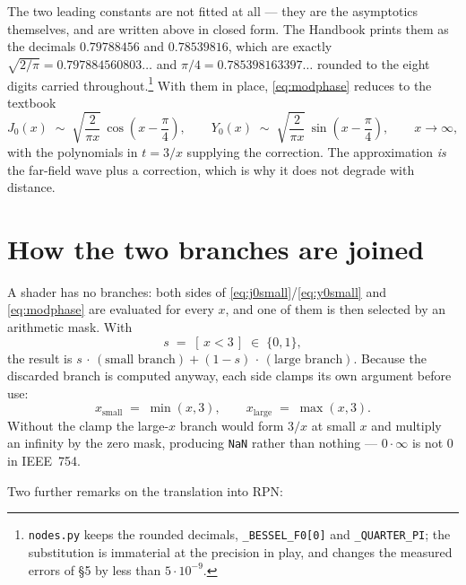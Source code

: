 \documentclass[11pt,a4paper]{article}
\newcommand{\node}[1]{\texttt{#1}}
\begin{document}
The two leading constants are not fitted at all --- they are the asymptotics
themselves, and are written above in closed form. The Handbook prints them as
the decimals $0.79788456$ and $0.78539816$, which are exactly
$\sqrt{2/\pi} = 0.797884560803\ldots$ and $\pi/4 = 0.785398163397\ldots$
rounded to the eight digits carried throughout.\footnote{\node{nodes.py} keeps
the rounded decimals, \node{\_BESSEL\_F0[0]} and \node{\_QUARTER\_PI}; the
substitution is immaterial at the precision in play, and changes the measured
errors of \S5 by less than $5\cdot10^{-9}$.} With them in place,
\eqref{eq:modphase} reduces to the textbook
%
\begin{equation}
  J_0(x) \;\sim\; \sqrt{\frac{2}{\pi x}}\,\cos\!\left(x-\frac{\pi}{4}\right),
  \qquad
  Y_0(x) \;\sim\; \sqrt{\frac{2}{\pi x}}\,\sin\!\left(x-\frac{\pi}{4}\right),
  \qquad x\to\infty,
\end{equation}
%
with the polynomials in $t=3/x$ supplying the correction. The approximation
\emph{is} the far-field wave plus a correction, which is why it does not
degrade with distance.

\section{How the two branches are joined}

A shader has no branches: both sides of \eqref{eq:j0small}/\eqref{eq:y0small}
and \eqref{eq:modphase} are evaluated for every $x$, and one of them is then
selected by an arithmetic mask. With
%
\begin{equation}
  s \;=\; [\,x < 3\,] \;\in\; \{0,1\},
\end{equation}
%
the result is $s\,\cdot\,(\text{small branch}) + (1-s)\,\cdot\,(\text{large
branch})$. Because the discarded branch is computed anyway, each side clamps
its own argument before use:
%
\begin{equation}
  x_{\text{small}} \;=\; \min(x,3),
  \qquad
  x_{\text{large}} \;=\; \max(x,3).
\end{equation}
%
Without the clamp the large-$x$ branch would form $3/x$ at small $x$ and
multiply an infinity by the zero mask, producing \texttt{NaN} rather than
nothing --- $0\cdot\infty$ is not $0$ in IEEE~754.

Two further remarks on the translation into RPN:
\end{document}
